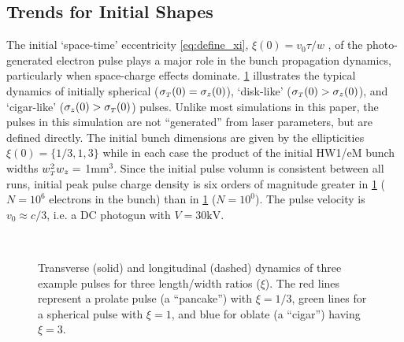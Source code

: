 \subsection{Trends for Initial Shapes}

The initial `space-time' eccentricity \ref{eq:define_xi}, $\xi ( 0 ) = v_{{ \scriptscriptstyle 0}} \tau / w $ , of the photo-generated electron pulse plays a major role in the bunch propagation dynamics, particularly when space-charge effects dominate.
\ref{fig:compare_shape} illustrates the typical dynamics of initially spherical ($ \sigma_{ {\scriptscriptstyle T} }(0) = \sigma_{z} ( 0 ) $), `disk-like' ($ \sigma_{ {\scriptscriptstyle T} } ( 0 ) > \sigma_{ z } ( 0 ) $), and `cigar-like' ($ \sigma_{ z } ( 0 ) > \sigma_{ {\scriptscriptstyle T} } ( 0 ) $) pulses.
Unlike most simulations in this paper, the pulses in this simulation are not ``generated'' from laser parameters, but are defined directly.
The initial bunch dimensions are given by the ellipticities $ \xi(0) = \{ 1/3 , 1 , 3 \} $ while in each case the product of the initial HW1/eM bunch widths $w_{{\scriptscriptstyle T}}^2 w_z = $ 1mm$^3$.
Since the initial pulse volumn is consistent between all runs, initial peak pulse charge density is six orders of magnitude greater in \ref{fig:compare_shape} ($ N = 10^{6} $ electrons in the bunch) than in \ref{fig:compare_shape} ($ N = 10^{0} $).
The pulse velocity is $ v_{{ \scriptscriptstyle 0}} \approx c/3 $, i.e. a DC photogun with $V = 30\text{kV} $.

\begin{figure}
  \centering
  \subfloat[][]{
    \label{fig:compare_shape_N1}
    
  }
  \\
  \subfloat[][]{
    \label{fig:compare_shape_N1e6}
    
  }
  \caption{
    Transverse (solid) and longitudinal (dashed) dynamics of three example pulses for three length/width ratios ($\xi$). 
    The red lines represent a prolate pulse (a ``pancake'') with $\xi=1/3$, green lines for a spherical pulse with $\xi=1$, and blue for oblate (a ``cigar'') having $\xi=3$.
  }
  \label{fig:compare_shape}
\end{figure}

%
%

